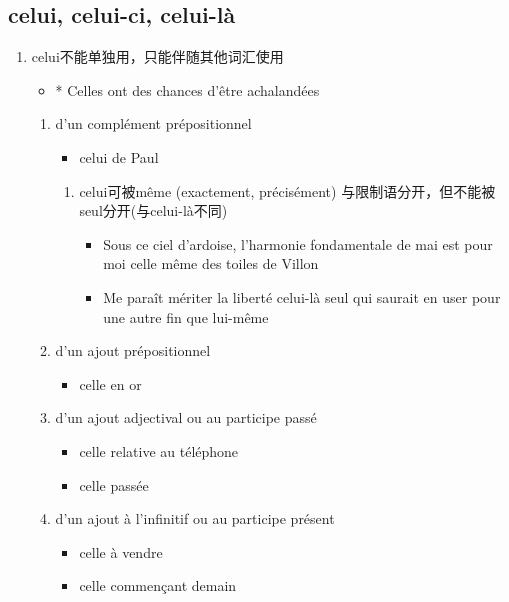 \documentclass[UTF8]{report}
\begin{document}
\subsection{celui, celui-ci, celui-là}
\begin{enumerate}
    \item celui不能单独用，只能伴随其他词汇使用
    \begin{itemize}
        \item * Celles ont des chances d’être achalandées
    \end{itemize}
    \begin{enumerate}
        \item d’un complément prépositionnel 
        \begin{itemize}
            \item celui de Paul
        \end{itemize}
        \begin{enumerate}
            \item celui可被même (exactement, précisément) 与限制语分开，但不能被seul分开(与celui-là不同)
            \begin{itemize}
                \item Sous ce ciel d’ardoise, l’harmonie fondamentale de mai est pour moi celle même des toiles de Villon
                \item Me paraît mériter la liberté celui-là seul qui saurait en user pour une autre fin que lui-même
            \end{itemize}
        \end{enumerate}
        \item d’un ajout prépositionnel
        \begin{itemize}
            \item celle en or
        \end{itemize}
        \item d’un ajout adjectival ou au participe passé
        \begin{itemize}
            \item celle relative au téléphone
            \item celle passée
        \end{itemize}
        \item d’un ajout à l’infinitif ou au participe présent
        \begin{itemize}
            \item celle à vendre
            \item celle commençant demain

\end{itemize}
\end{enumerate}
\end{enumerate}
\end{document}
